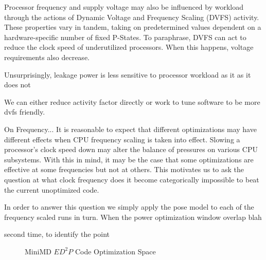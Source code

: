 Processor frequency and supply voltage may also be influenced by workload through the actions of Dynamic Voltage and Frequency Scaling (DVFS) activity. These properties vary in tandem, taking on predetermined values dependent on a hardware-specific number of fixed P-States. To paraphrase, DVFS can act to reduce the clock speed of underutilized processors. When this happens, voltage requirements also decrease.

Unsurprisingly, leakage power is less sensitive to processor workload as it as it does not 


We can either reduce activity factor directly or work to tune software to be more dvfs friendly.



On Frequency...
It is reasonable to expect that different optimizations may have different effects when CPU frequency scaling is taken into effect. Slowing a processor's clock speed down may alter the balance of pressures on various CPU subsystems. With this in mind, it may be the case that some optimizations are effective at some frequencies but not at others. This motivates us to ask the question at what clock frequency does it become categorically impossible to beat the current unoptimized code.

In order to answer this question we simply apply the pose model to each of the frequency scaled runs in turn.
When the power optimization window overlap blah

second time, to identify the point 


\begin{figure}
\centering

\caption{MiniMD $ED^2P$ Code Optimization Space}
\label{fig:minimd}
\end{figure}




